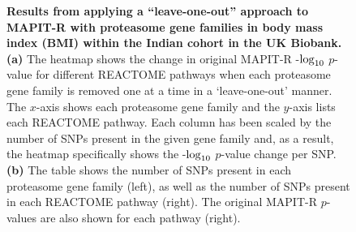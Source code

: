 \documentclass[10pt]{article}
\def\log{{\rm log}}
\begin{document}
\begin{figure}[H]
{\begin{tabular}{|cc|ccc|}
  \hline
\end{tabular}}
\caption{\textbf{Results from applying a ``leave-one-out'' approach to MAPIT-R with proteasome gene families in body mass index (BMI) within the Indian cohort in the UK Biobank.} \textbf{(a)} The heatmap shows the change in original MAPIT-R -$\log_{10}$ $p$-value for different REACTOME pathways when each proteasome gene family is removed one at a time in a `leave-one-out' manner. The $x$-axis shows each proteasome gene family and the $y$-axis lists each REACTOME pathway. Each column has been scaled by the number of SNPs present in the given gene family and, as a result, the heatmap specifically shows the -$\log_{10}$ $p$-value change per SNP. \textbf{(b)} The table shows the number of SNPs present in each proteasome gene family (left), as well as the number of SNPs present in each REACTOME pathway (right). The original MAPIT-R $p$-values are also shown for each pathway (right).}
\label{InterPath-Supp-Figure-Prot-Heatplots-Indian}
\end{figure}
\clearpage
\end{document}

